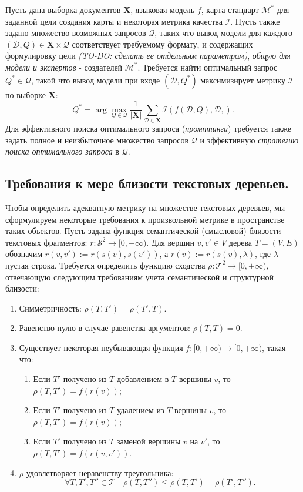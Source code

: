 \documentclass[12pt]{article}
\newcommand{\X}{\mathbf{X}}
\newcommand{\D}{\mathcal{D}}
\newcommand{\M}{\mathcal{M}}
\newcommand{\I}{\mathcal{I}}
\newcommand{\Q}{\mathcal{Q}}
\begin{document}
Пусть дана выборка документов $\X$, языковая модель $f$, карта-стандарт $\M^*$ для заданной цели создания карты и некоторая метрика качества $\I$. Пусть также задано множество возможных запросов $\Q$, таких что вывод модели для каждого $(\D, Q)\in\X\times\Q$ соответствует требуемому формату, и содержащих формулировку цели \textit{(TO-DO: сделать ее отдельным параметром)}, \textit{общую для модели и экспертов} - создателей $\M^*$. Требуется найти оптимальный запрос $Q^*\in\Q$, такой что вывод модели при входе $(\D, Q^*)$ максимизирует метрику $\I$ по выборке $\X$:
$$
Q^* = \arg\max\limits_{Q\in\Q} \frac{1}{|\X|}\sum\limits_{\D\in\X} \I(f(\D, Q), \D, ).
$$
Для эффективного поиска оптимального запроса (\textit{промптинга}) требуется также задать полное и неизбыточное множество запросов $\Q$ и эффективную \textit{стратегию поиска оптимального запроса} в $\Q$.

\subsection{Требования к мере близости текстовых деревьев.} \label{metric_requirements}
Чтобы определить адекватную метрику на множестве текстовых деревьев, мы сформулируем некоторые требования к произвольной метрике в пространстве таких объектов. Пусть задана функция семантической (смысловой) близости текстовых фрагментов: $r: \mathcal{S}^2 \rightarrow [0, +\infty)$. Для вершин $v, v'\in V$ дерева $T=(V, E)$ обозначим $r(v, v') := r(s(v), s(v'))$, а $r(v) := r(s(v), \lambda)$, где $\lambda$~--- пустая строка. Требуется определить функцию сходства $\rho: \mathcal{T}^2 \rightarrow [0, +\infty)$, отвечающую следующим требованиям учета семантической и структурной близости:
\begin{enumerate}
    \item Симметричность: $\rho(T, T') = \rho(T', T)$.
    \item Равенство нулю в случае равенства аргументов: $\rho(T, T) = 0$.
    \item Существует некоторая неубывающая функция $f: [0,+\infty) \rightarrow [0,+\infty)$, такая что:
    \begin{enumerate}
        \item Если $T'$ получено из $T$ добавлением в $T$ вершины $v$, то $\rho(T, T') = f(r(v))$;
        \item Если $T'$ получено из $T$ удалением из $T$ вершины $v$, то $\rho(T, T') = f(r(v))$;
        \item Если $T'$ получено из $T$ заменой вершины $v$ на $v'$, то $\rho(T, T')= f(r(v, v'))$.
    \end{enumerate}
    \item $\rho$ удовлетворяет неравенству треугольника: 
    \begin{equation} \label{metric_requirement_6}
        \forall T, T', T''\in\mathcal{T}\quad \rho(T,T'')\leq\rho(T,T')+\rho(T',T'').
    \end{equation}
\end{enumerate}
\end{document}

